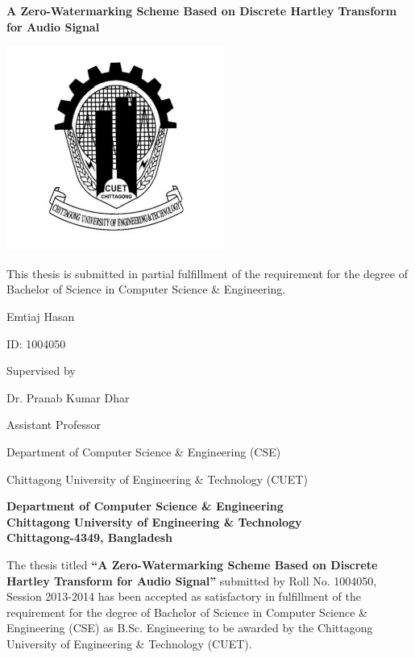 \begin{center}
\textbf{{\large A Zero-Watermarking Scheme Based on Discrete Hartley Transform for Audio Signal} }

\includegraphics[scale=.75]{image/cuet-logo.png}


This thesis is submitted in partial fulfillment of the requirement for the degree of Bachelor of Science in Computer Science \& Engineering. \newline

\vspace{10mm}

Emtiaj Hasan

ID: 1004050


\vspace{20mm}

Supervised by \

Dr. Pranab Kumar Dhar \

Assistant Professor \

Department of Computer Science \& Engineering (CSE) \

Chittagong University of Engineering \& Technology (CUET)




\vfill
\textbf{{\large Department of Computer Science \& Engineering} \\
{\normalsize Chittagong University of Engineering \& Technology} \\
{\small Chittagong-4349, Bangladesh}}
\end{center}

\newpage


\thispagestyle{empty}

The thesis titled \textbf{\textquotedblleft A Zero-Watermarking Scheme Based on Discrete Hartley Transform for Audio Signal\textquotedblright} submitted by Roll No. 1004050, Session 2013-2014 has been accepted as satisfactory in fulfillment of the requirement for the degree of Bachelor of Science in Computer Science \& Engineering (CSE) as B.Sc. Engineering to be awarded by the Chittagong University of Engineering \& Technology (CUET).

